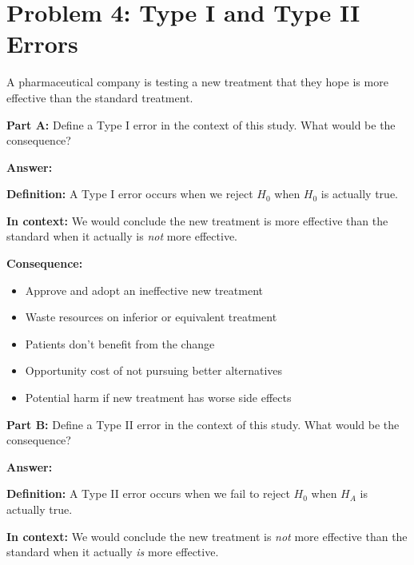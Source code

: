 \documentclass[11pt]{article}
\begin{document}
\newpage

\section{Problem 4: Type I and Type II Errors}

A pharmaceutical company is testing a new treatment that they hope is more effective than the standard treatment.

\vspace{6pt}

\textbf{Part A:} Define a Type I error in the context of this study. What would be the consequence?

\vspace{6pt}
\textcolor{answergreen}{\textbf{Answer:}}

\vspace{4pt}
\textbf{Definition:} A Type I error occurs when we reject $H_0$ when $H_0$ is actually true.

\vspace{4pt}
\textbf{In context:} We would conclude the new treatment is more effective than the standard when it actually is \textit{not} more effective.

\vspace{4pt}
\textbf{Consequence:}
\begin{itemize}
\item Approve and adopt an ineffective new treatment
\item Waste resources on inferior or equivalent treatment
\item Patients don't benefit from the change
\item Opportunity cost of not pursuing better alternatives
\item Potential harm if new treatment has worse side effects
\end{itemize}

\vspace{12pt}

\textbf{Part B:} Define a Type II error in the context of this study. What would be the consequence?

\vspace{6pt}
\textcolor{answergreen}{\textbf{Answer:}}

\vspace{4pt}
\textbf{Definition:} A Type II error occurs when we fail to reject $H_0$ when $H_A$ is actually true.

\vspace{4pt}
\textbf{In context:} We would conclude the new treatment is \textit{not} more effective than the standard when it actually \textit{is} more effective.
\end{document}
